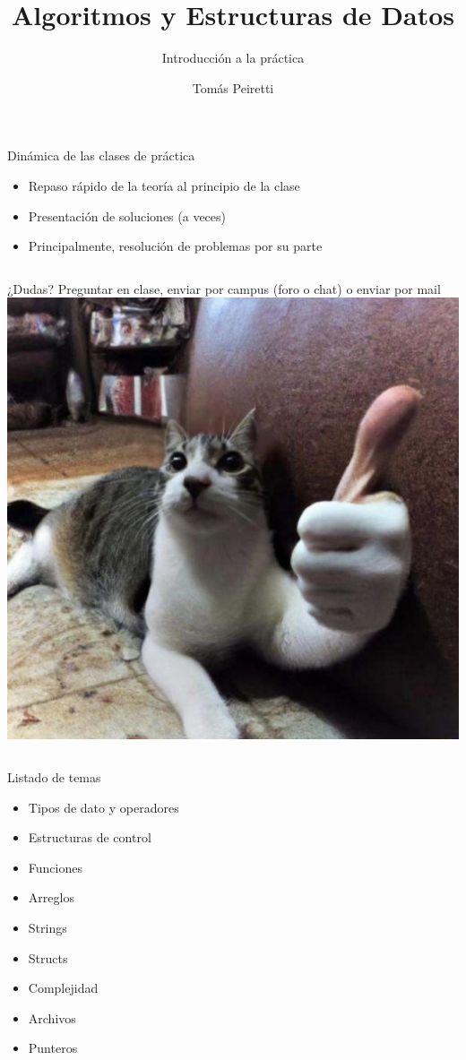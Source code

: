 \documentclass[12pt]{beamer}
\title{Algoritmos y Estructuras de Datos}
\subtitle{Introducción a la práctica}
\author{Tomás Peiretti}
\date{}
\begin{document}
\maketitle

\begin{frame}{Dinámica de las clases de práctica}
    \begin{itemize}
        \item Repaso rápido de la teoría al principio de la clase
        \item Presentación de soluciones (a veces)
        \item Principalmente, \alert{resolución de problemas por su parte}
    \end{itemize}
    \bigskip
    \begin{columns}
        ¿Dudas? Preguntar en clase, enviar por campus (foro o chat) o enviar por mail
        \includegraphics[width=\textwidth]{ok-cat.jpeg}
    \end{columns}
\end{frame}

\begin{frame}{Listado de temas}
    \begin{itemize}
        \item Tipos de dato y operadores
        \item Estructuras de control
        \item Funciones
        \item Arreglos
        \item Strings
        \item Structs
        \item Complejidad
        \item Archivos
        \item Punteros
    \end{itemize}
\end{frame}
\end{document}
